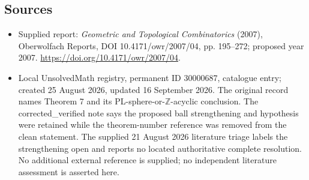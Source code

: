 \documentclass[11pt]{article}
\newcommand{\Z}{\mathbb{Z}}
\begin{document}
\subsection{Sources}
\begin{itemize}
\item Supplied report: \emph{Geometric and Topological Combinatorics} (2007), Oberwolfach Reports, DOI 10.4171/owr/2007/04, pp. 195--272; proposed year 2007. \url{https://doi.org/10.4171/owr/2007/04}.
\item Local UnsolvedMath registry, permanent ID 30000687, catalogue entry; created 25 August 2026, updated 16 September 2026. The original record names Theorem 7 and its PL-sphere-or-$\Z$-acyclic conclusion. The corrected\_verified note says the proposed ball strengthening and hypothesis were retained while the theorem-number reference was removed from the clean statement. The supplied 21 August 2026 literature triage labels the strengthening open and reports no located authoritative complete resolution. No additional external reference is supplied; no independent literature assessment is asserted here.
\end{itemize}
\end{document}
